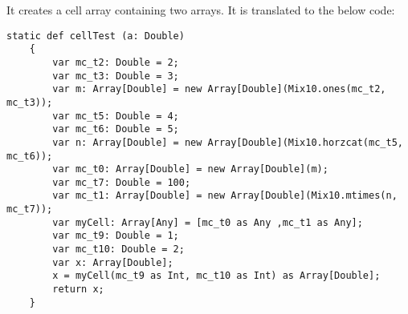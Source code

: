 It creates a cell array containing two arrays. It is translated to the below
\xten code:

\begin{lstlisting}[language=X10,numbers=none]
static def cellTest (a: Double)
	{
		var mc_t2: Double = 2;
		var mc_t3: Double = 3;
		var m: Array[Double] = new Array[Double](Mix10.ones(mc_t2, mc_t3));
		var mc_t5: Double = 4;
		var mc_t6: Double = 5;
		var n: Array[Double] = new Array[Double](Mix10.horzcat(mc_t5, mc_t6));
		var mc_t0: Array[Double] = new Array[Double](m);
		var mc_t7: Double = 100;
		var mc_t1: Array[Double] = new Array[Double](Mix10.mtimes(n, mc_t7));
		var myCell: Array[Any] = [mc_t0 as Any ,mc_t1 as Any];
		var mc_t9: Double = 1;
		var mc_t10: Double = 2;
		var x: Array[Double];
		x = myCell(mc_t9 as Int, mc_t10 as Int) as Array[Double];
		return x;
	}
\end{lstlisting}
